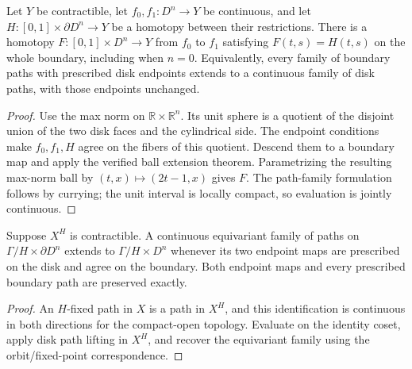 \begin{proposition}\label{prop:disk-homotopy-extension}
Let $Y$ be contractible, let $f_0,f_1:D^n\to Y$ be continuous, and let
$H:[0,1]\times\partial D^n\to Y$ be a homotopy between their restrictions.
There is a homotopy $F:[0,1]\times D^n\to Y$ from $f_0$ to $f_1$ satisfying
$F(t,s)=H(t,s)$ on the whole boundary, including when $n=0$.
Equivalently, every family of boundary paths with prescribed disk endpoints
extends to a continuous family of disk paths, with those endpoints unchanged.
\end{proposition}
\begin{proof}
\leanok
Use the max norm on $\mathbb R\times\mathbb R^n$. Its unit sphere is a quotient
of the disjoint union of the two disk faces and the cylindrical side.
The endpoint conditions make $f_0,f_1,H$ agree on the fibers of this quotient.
Descend them to a boundary map and apply the verified ball extension theorem.
Parametrizing the resulting max-norm ball by $(t,x)\mapsto(2t-1,x)$ gives
$F$. The path-family formulation follows by currying; the unit interval is
locally compact, so evaluation is jointly continuous.
\end{proof}

\begin{proposition}\label{prop:orbit-cell-path-lifting}
Suppose $X^H$ is contractible. A continuous equivariant family of paths on
$\Gamma/H\times\partial D^n$ extends to $\Gamma/H\times D^n$ whenever its
two endpoint maps are prescribed on the disk and agree on the boundary.
Both endpoint maps and every prescribed boundary path are preserved exactly.
\end{proposition}
\begin{proof}
\leanok
An $H$-fixed path in $X$ is a path in $X^H$, and this identification is continuous
in both directions for the compact-open topology. Evaluate on the identity
coset, apply disk path lifting in $X^H$, and recover the equivariant family
using the orbit/fixed-point correspondence.
\end{proof}

